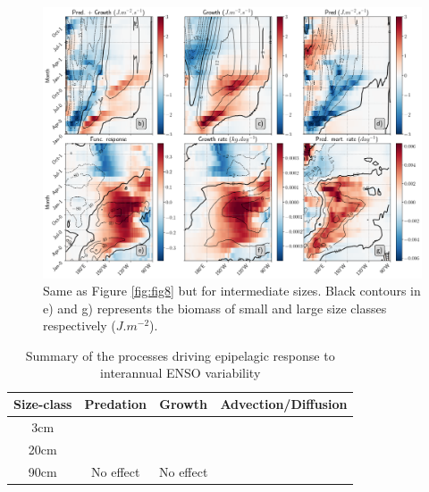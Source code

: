 
\begin{figure}[h!tp]
	\centering
	\includegraphics[scale=0.4]{figs/fig9.png}	
	\caption{Same as Figure \ref{fig:fig8} but for intermediate sizes. Black contours in e) and g) represents the biomass of small and large size classes respectively ($J.m^{-2}$).}
	\label{fig:fig9}
\end{figure}



\begin{table}[]
    \centering
    \begin{tabular}{c c c c}
         Size-class & Predation & Growth & Advection/Diffusion \\
            \hline 
            \hline
         3cm & & & \\
         20cm & & & \\
         90cm & No effect & No effect & & \\
    \end{tabular}
    \caption{Summary of the processes driving epipelagic response to interannual ENSO variability}
    \label{tab:summary-processes}
\end{table}


